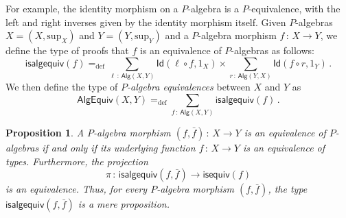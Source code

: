 \documentclass[10pt,a4paper,oneside,reqno]{amsart}
\theoremstyle{mythm}
\newtheorem{proposition}[theorem]{Proposition}
\theoremstyle{mydef}
\theoremstyle{myrmk}
\newcommand{\defeq}{=_{\mathrm{def}}}
\newcommand{\co}{\,{:}\,}
\newcommand{\Id}{\mathsf{Id}}
\newcommand{\Palg}{\mathsf{Alg}}
\renewcommand{\sup}{\mathrm{sup}}
\newcommand{\isalgequiv}{\mathsf{isalgequiv}}
\newcommand{\AlgEquiv}{\mathsf{AlgEquiv}}
\begin{document}
For example, the identity morphism on a $P$-algebra is a $P$-equivalence, with the left and right inverses given by the identity morphism itself.  Given $P$-algebras $X = (X, \sup_X)$ and $Y = (Y, \sup_Y)$ and a $P$-algebra morphism $f \co X \to Y$, we define the type of proofs that $f$ is an equivalence of $P$-algebras as follows:
\[
\isalgequiv(f) \defeq   \sum_{\ell \co  \Palg(X,Y)} \Id( \ell \circ f, 1_X )  \times 
    \sum_{r  \co \Palg(Y, X)} \Id( f \circ r , 1_Y ) \, .
\]
We then define the type of \emph{$P$-algebra equivalences} between $X$ and $Y$ as
\[
\AlgEquiv(X, Y)
\defeq    \sum_{f \co \Palg(X,Y)} \isalgequiv(f)  \, . 
\] 


\begin{proposition}\label{WAlgSpace} A $P$-algebra morphism $(f, \bar{f}) \co X \to Y$ is an equivalence of
$P$-algebras if and only
if its underlying function $f \co X \to Y$ is an equivalence of types. Furthermore, the projection
\[
\pi \co \isalgequiv(f, \bar{f})  \to \mathsf{isequiv}(f)  
\]
is an equivalence. Thus, for every $P$-algebra morphism $(f, \bar{f})$, the type $\isalgequiv(f, \bar{f})$ is
a mere proposition. 
\end{proposition}  
\end{document}
